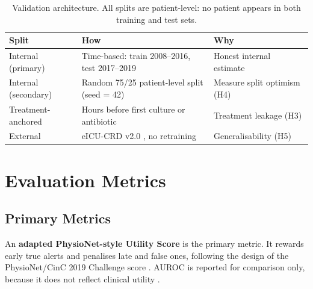 \begin{table}[H]
    \centering\small
    \begin{tabular}{p{2.8cm}p{6.5cm}p{3.5cm}}
        \toprule
        \textbf{Split} & \textbf{How} & \textbf{Why} \\
        \midrule
        Internal (primary) & Time-based: train 2008--2016, test 2017--2019
        \cite{guo2022temporal} & Honest internal estimate \\
        Internal (secondary) & Random 75/25 patient-level split (seed = 42)
        & Measure split optimism (H4) \\
        Treatment-anchored & Hours before first culture or antibiotic
        \cite{kamran2024evaluation} & Treatment leakage (H3) \\
        External & eICU-CRD v2.0 \cite{pollard2018eicu}, no retraining
        & Generalisability (H5) \\
        \bottomrule
    \end{tabular}
    \caption{Validation architecture. All splits are patient-level: no patient
    appears in both training and test sets.}
    \label{tab:validation}
\end{table}


\section{Evaluation Metrics}
\label{sec:metrics}

\subsection{Primary Metrics}

An \textbf{adapted PhysioNet-style Utility Score} is the primary metric. It
rewards early true alerts and penalises late and false ones, following the
design of the PhysioNet/CinC 2019 Challenge score \cite{reyna2020utility}.
AUROC is reported for comparison only, because it does not reflect clinical
utility \cite{wang2025srpm}.

